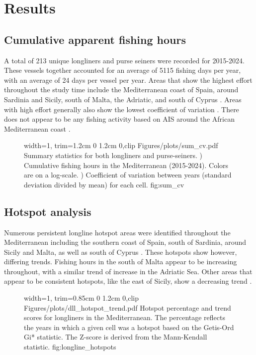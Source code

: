 \chapter{Results}
\section{Cumulative apparent fishing hours}
A total of 213 unique longliners and purse seiners were recorded for 2015-2024. These vessels together accounted
for an average of 5115 fishing days per year, with an average of 24 days per vessel per year. Areas that show  the highest effort throughout
the study time include the Mediterranean coast of Spain, around Sardinia and Sicily, south of Malta, the Adriatic, and
south of Cyprus . Areas with high effort generally also show the lowest coefficient of variation .
There does not appear to be any fishing activity based on AIS around the African Mediterranean coast .

\medskip

\begin{figure}[ht]
    {width=1\linewidth, trim=1.2cm 0 1.2cm 0,clip}
    {Figures/plots/sum_cv.pdf}
    {%
    Summary statistics for both longliners and purse-seiners. ) Cumulative fishing hours in the Mediterranean (2015-2024). 
    Colors are on a log-scale. ) Coefficient of variation between years (standard deviation divided by mean) for each cell.
    }{fig:sum_cv}
\end{figure}


\FloatBarrier
\section{Hotspot analysis}
Numerous persistent longline hotspot areas were identified throughout the Mediterranean including the southern coast of Spain, south of Sardinia, 
around Sicily and Malta, as well as south of Cyprus . These hotspots show however, differing trends. Fishing hours
in the south of Malta appear to be increasing throughout, with a similar trend of increase in the Adriatic Sea. Other areas that appear to be consistent
hotspots, like the east of Sicily, show a decreasing trend .

\begin{figure}[H]
    {width=1\linewidth, trim=0.85cm 0 1.2cm 0,clip}
    {Figures/plots/dll_hotspot_trend.pdf}
    {%
    Hotspot percentage and trend scores for longliners in the Mediterranean.
    The percentage reflects the years in which a given cell was a hotspot based on the Getis-Ord Gi* statistic.
    The Z-score is derived from the Mann-Kendall statistic.}
    {fig:longline_hotspots}
\end{figure}

